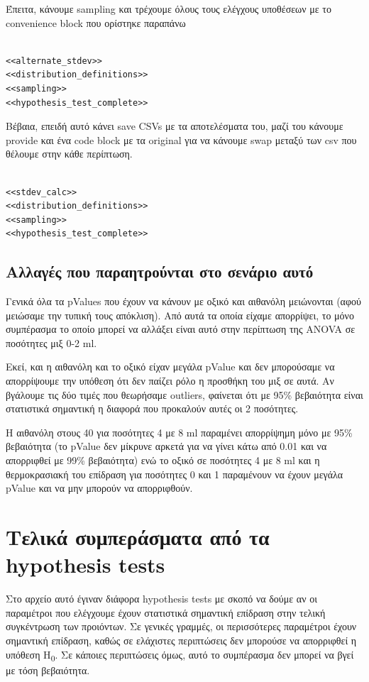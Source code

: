 \documentclass[11pt]{article}
\begin{document}
Έπειτα, κάνουμε sampling και τρέχουμε όλους τους ελέγχους υποθέσεων με το convenience block που ορίστηκε παραπάνω

\begin{verbatim}

<<alternate_stdev>>
<<distribution_definitions>>
<<sampling>>
<<hypothesis_test_complete>>

\end{verbatim}

Βέβαια, επειδή αυτό κάνει save CSVs με τα αποτελέσματα του, μαζί του κάνουμε provide και ένα code block με τα original για να κάνουμε swap μεταξύ των csv που θέλουμε στην κάθε περίπτωση.

\begin{verbatim}

<<stdev_calc>>
<<distribution_definitions>>
<<sampling>>
<<hypothesis_test_complete>>

\end{verbatim}

\subsection{Αλλαγές που παραητρούνται στο σενάριο αυτό}
\label{sec:orgdc5d814}
Γενικά όλα τα pValues που έχουν να κάνουν με οξικό και αιθανόλη μειώνονται (αφού μειώσαμε την τυπική τους απόκλιση). Από αυτά τα οποία είχαμε απορρίψει, το μόνο συμπέρασμα το οποίο μπορεί να αλλάξει είναι αυτό στην περίπτωση της ANOVA σε ποσότητες μιξ 0-2 ml.

Εκεί, και η αιθανόλη και το οξικό είχαν μεγάλα pValue και δεν μπορούσαμε να απορρίψουμε την υπόθεση ότι δεν παίζει ρόλο η προσθήκη του μιξ σε αυτά. Αν βγάλουμε τις δύο τιμές που θεωρήσαμε outliers, φαίνεται ότι με 95\% βεβαιότητα είναι στατιστικά σημαντική η διαφορά που προκαλούν αυτές οι 2 ποσότητες.

Η αιθανόλη στους 40 για ποσότητες 4 με 8 ml παραμένει απορρίψημη μόνο με 95\% βεβαιότητα (το pValue δεν μίκρυνε αρκετά για να γίνει κάτω από 0.01 και να απορριφθεί με 99\% βεβαιότητα) ενώ το οξικό σε ποσότητες 4 με 8 ml και η θερμοκρασιακή του επίδραση για ποσότητες 0 και 1 παραμένουν να έχουν μεγάλα pValue και να μην μπορούν να απορριφθούν.

\section{Τελικά συμπεράσματα από τα hypothesis tests}
\label{sec:org98e6ce3}
Στο αρχείο αυτό έγιναν διάφορα hypothesis tests με σκοπό να δούμε αν οι παραμέτροι που ελέγχουμε έχουν στατιστικά σημαντική επίδραση στην τελική συγκέντρωση των προιόντων. Σε γενικές γραμμές, οι περισσότερες παραμέτροι έχουν σημαντική επίδραση, καθώς σε ελάχιστες περιπτώσεις δεν μπορούσε να απορριφθεί η υπόθεση H\textsubscript{0}. Σε κάποιες περιπτώσεις όμως, αυτό το συμπέρασμα δεν μπορεί να βγεί με τόση βεβαιότητα.
\end{document}
